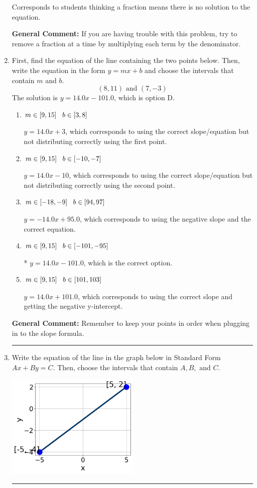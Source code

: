 \documentclass{extbook}[14pt]
\newcommand{\litem}[1]{\item #1

\rule{\textwidth}{0.4pt}}
\begin{document}
\begin{enumerate}
{\begin{enumerate}[label=\Alph*.]
Corresponds to students thinking a fraction means there is no solution to the equation.
\end{enumerate}

\textbf{General Comment:} If you are having trouble with this problem, try to remove a fraction at a time by multiplying each term by the denominator.
}
\litem{
First, find the equation of the line containing the two points below. Then, write the equation in the form $ y=mx+b $ and choose the intervals that contain $m$ and $b$.
\[ (8, 11) \text{ and } (7, -3) \]The solution is \( y = 14.0x -101.0 \), which is option D.\begin{enumerate}[label=\Alph*.]
\item \( m \in [9, 15] \hspace*{3mm} b \in [3, 8] \)

 $y = 14.0x + 3$, which corresponds to using the correct slope/equation but not distributing correctly using the first point.
\item \( m \in [9, 15] \hspace*{3mm} b \in [-10, -7] \)

 $y = 14.0x -10$, which corresponds to using the correct slope/equation but not distributing correctly using the second point.
\item \( m \in [-18, -9] \hspace*{3mm} b \in [94, 97] \)

 $y = -14.0x + 95.0$, which corresponds to using the negative slope and the correct equation.
\item \( m \in [9, 15] \hspace*{3mm} b \in [-101, -95] \)

* $y = 14.0x -101.0$, which is the correct option.
\item \( m \in [9, 15] \hspace*{3mm} b \in [101, 103] \)

 $y = 14.0x + 101.0$, which corresponds to using the correct slope and getting the negative y-intercept.
\end{enumerate}

\textbf{General Comment:} Remember to keep your points in order when plugging in to the slope formula.
}
\litem{
Write the equation of the line in the graph below in Standard Form $Ax+By=C$. Then, choose the intervals that contain $A, B, \text{ and } C$.

\begin{center}
    \includegraphics[width=0.5\textwidth]{../Figures/linearGraphToStandardC.png}
\end{center}


}
\end{enumerate}
\end{document}
